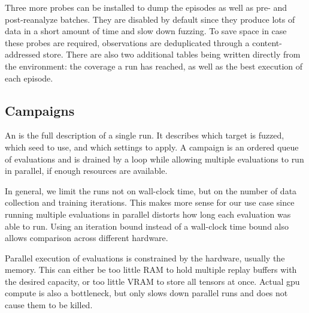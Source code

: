 Three more probes can be installed to dump the episodes as well as pre- and post-reanalyze batches.
They are disabled by default since they produce lots of data in a short amount of time and slow down fuzzing.
To save space in case these probes are required, observations are deduplicated
through a content-addressed store.
There are also two additional tables being written directly from the environment:
the coverage a run has reached, as well as the best execution of each episode.

\subsection{Campaigns}\label{sec:impl-campaigns}

An  is the full description of a single run.
It describes which target is fuzzed, which seed to use, and which settings to apply.
A campaign is an ordered queue of evaluations and is drained by a loop while allowing
multiple evaluations to run in parallel, if enough resources are available.

In general, we limit the runs not on wall-clock time, but on the number of data
collection and training iterations.
This makes more sense for our use case since running multiple evaluations in parallel
distorts how long each evaluation was able to run.
Using an iteration bound instead of a wall-clock time bound also allows comparison
across different hardware.

Parallel execution of evaluations is constrained by the hardware, usually the memory.
This can either be too little RAM to hold multiple replay buffers with
the desired capacity, or too little VRAM to store all tensors at once.
Actual \gls{gpu} compute is also a bottleneck, but only slows down parallel runs and does
not cause them to be killed.

